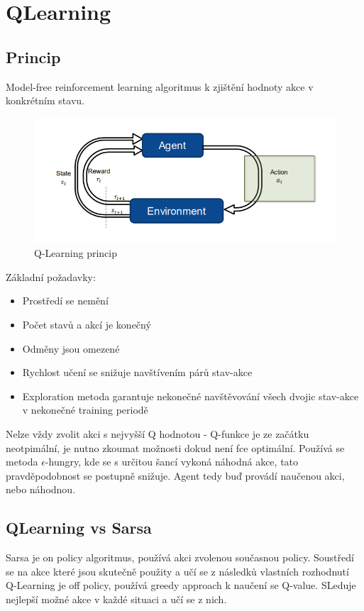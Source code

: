 \section{QLearning}
\subsection{Princip}
Model-free reinforcement learning algoritmus k zjištění hodnoty akce v konkrétním stavu.
\begin{figure}[h!]
    \centering
    \includegraphics[width=0.5\linewidth]{images/qlearn.png}
    \caption{Q-Learning princip}
    \label{fig:enter-label}
\end{figure}
Základní požadavky:
\begin{itemize}
    \item Prostředí se nemění
    \item Počet stavů a akcí je konečný
    \item Odměny jsou omezené
    \item Rychlost učení se snižuje navštívením párů stav-akce
    \item Exploration metoda garantuje nekonečné navštěvování všech dvojic stav-akce v nekonečné training periodě
\end{itemize}
Nelze vždy zvolit akci s nejvyšší Q hodnotou - Q-funkce je ze začátku neotpimální, je nutno zkoumat možnosti dokud není fce optimální.
Používá se metoda $\epsilon$-hungry, kde se s určitou šancí vykoná náhodná akce, tato pravděpodobnost se postupně snižuje. Agent tedy buď provádí naučenou akci, nebo náhodnou.

\subsection{QLearning vs Sarsa}
Sarsa je on policy algoritmus, používá akci zvolenou současnou policy. Soustředí se na akce které jsou skutečně použity a učí se z následků vlastních rozhodnutí
Q-Learning je off policy, používá greedy approach k naučení se Q-value. SLeduje nejlepší možné akce v každé situaci a učí se z nich.

